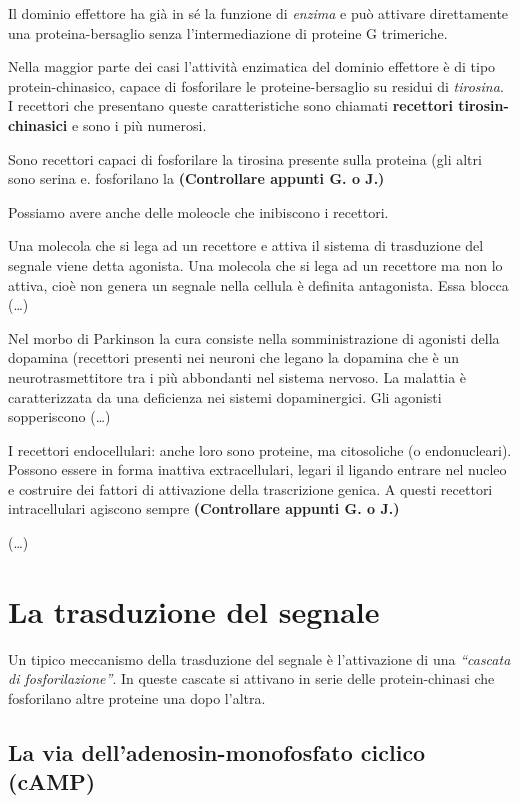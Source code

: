 \documentclass[]{article}
\begin{document}
Il dominio effettore ha già in sé la funzione di \emph{enzima} e può
attivare direttamente una proteina-bersaglio senza l'intermediazione di
proteine G trimeriche.

Nella maggior parte dei casi l'attività enzimatica del dominio effettore
è di tipo protein-chinasico, capace di fosforilare le proteine-bersaglio
su residui di \emph{tirosina}. I recettori che presentano queste
caratteristiche sono chiamati \textbf{recettori tirosin-chinasici} e
sono i più numerosi.

Sono recettori capaci di fosforilare la tirosina presente sulla proteina
(gli altri sono serina e. fosforilano la \textbf{(Controllare appunti G.
o J.)}

Possiamo avere anche delle moleocle che inibiscono i recettori.

Una molecola che si lega ad un recettore e attiva il sistema di
trasduzione del segnale viene detta agonista. Una molecola che si lega
ad un recettore ma non lo attiva, cioè non genera un segnale nella
cellula è definita antagonista. Essa blocca (\ldots{})

Nel morbo di Parkinson la cura consiste nella somministrazione di
agonisti della dopamina (recettori presenti nei neuroni che legano la
dopamina che è un neurotrasmettitore tra i più abbondanti nel sistema
nervoso. La malattia è caratterizzata da una deficienza nei sistemi
dopaminergici. Gli agonisti sopperiscono (\ldots{})

I recettori endocellulari: anche loro sono proteine, ma citosoliche (o
endonucleari). Possono essere in forma inattiva extracellulari, legari
il ligando entrare nel nucleo e costruire dei fattori di attivazione
della trascrizione genica. A questi recettori intracellulari agiscono
sempre \textbf{(Controllare appunti G. o J.)}

(\ldots{})

\section{La trasduzione del segnale}\label{la-trasduzione-del-segnale}

Un tipico meccanismo della trasduzione del segnale è l'attivazione di
una \emph{``cascata di fosforilazione''}. In queste cascate si attivano
in serie delle protein-chinasi che fosforilano altre proteine una dopo
l'altra.

\subsection{La via dell'adenosin-monofosfato ciclico
(cAMP)}\label{la-via-delladenosin-monofosfato-ciclico-camp}
\end{document}
